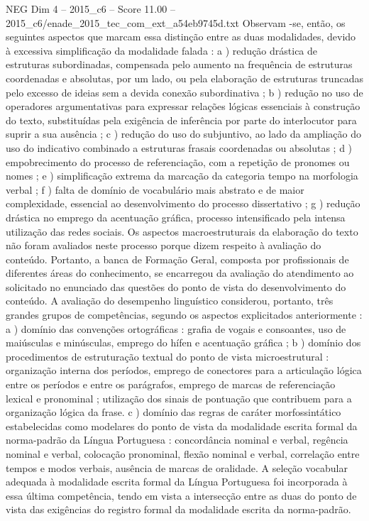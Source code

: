 \begin{textsample}{NEG Dim 4 – 2015\_c6 – Score 11.00 – 2015\_c6/enade\_2015\_tec\_com\_ext\_a54eb9745d.txt}
Observam -se, então, os seguintes aspectos que marcam essa distinção entre as duas modalidades, devido à excessiva simplificação da modalidade falada : a ) redução drástica de estruturas subordinadas, compensada pelo aumento na frequência de estruturas coordenadas e absolutas, por um lado, ou pela elaboração de estruturas truncadas pelo excesso de ideias sem a devida conexão subordinativa ; b ) redução no uso de operadores argumentativas para expressar relações lógicas essenciais à construção do texto, substituídas pela exigência de inferência por parte do interlocutor para suprir a sua ausência ; c ) redução do uso do subjuntivo, ao lado da ampliação do uso do indicativo combinado a estruturas frasais coordenadas ou absolutas ; d ) empobrecimento do processo de referenciação, com a repetição de pronomes ou nomes ; e ) simplificação extrema da marcação da categoria tempo na morfologia verbal ; f ) falta de domínio de vocabulário mais abstrato e de maior complexidade, essencial ao desenvolvimento do processo dissertativo ; g ) redução drástica no emprego da acentuação gráfica, processo intensificado pela intensa utilização das redes sociais.
Os aspectos macroestruturais da elaboração do texto não foram avaliados neste processo porque dizem respeito à avaliação do conteúdo.
Portanto, a banca de Formação Geral, composta por profissionais de diferentes áreas do conhecimento, se encarregou da avaliação do atendimento ao solicitado no enunciado das questões do ponto de vista do desenvolvimento do conteúdo.
A avaliação do desempenho linguístico considerou, portanto, três grandes grupos de competências, segundo os aspectos explicitados anteriormente : a ) domínio das convenções ortográficas : grafia de vogais e consoantes, uso de maiúsculas e minúsculas, emprego do hífen e acentuação gráfica ; b ) domínio dos procedimentos de estruturação textual do ponto de vista microestrutural : organização interna dos períodos, emprego de conectores para a articulação lógica entre os períodos e entre os parágrafos, emprego de marcas de referenciação lexical e pronominal ; utilização dos sinais de pontuação que contribuem para a organização lógica da frase. c ) domínio das regras de caráter morfossintático estabelecidas como modelares do ponto de vista da modalidade escrita formal da norma-padrão da Língua Portuguesa : concordância nominal e verbal, regência nominal e verbal, colocação pronominal, flexão nominal e verbal, correlação entre tempos e modos verbais, ausência de marcas de oralidade.
A seleção vocabular adequada à modalidade escrita formal da Língua Portuguesa foi incorporada à essa última competência, tendo em vista a intersecção entre as duas do ponto de vista das exigências do registro formal da modalidade escrita da norma-padrão.

\end{textsample}
